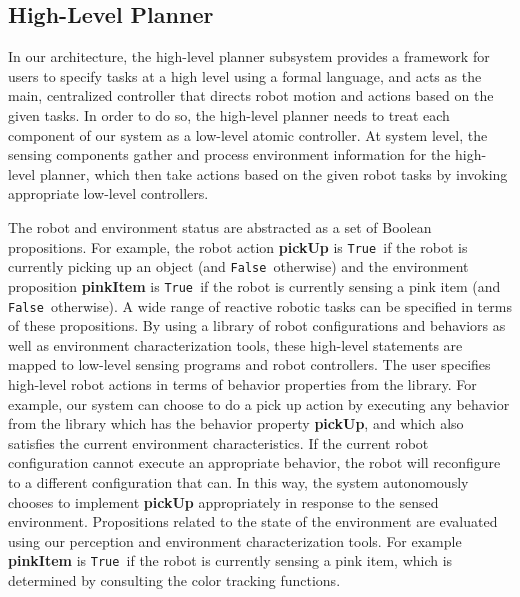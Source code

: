 \documentclass[conference]{IEEEtran}
\newcommand{\lt}{{\tt True }}
\newcommand{\lf}{{\tt False }}
\begin{document}
\subsection{High-Level Planner}
\label{sec:high-level}

In our architecture, the high-level planner subsystem provides a framework for users to specify tasks  at a high level using a formal language, and acts as the main, centralized controller that directs robot motion and actions based on the given tasks.
In order to do so, the high-level planner needs to treat each component of our system as a low-level atomic controller.
At system level, the sensing components gather and process environment information for the high-level planner, which then take actions based on the given robot tasks by invoking appropriate low-level controllers.

The robot and environment status are abstracted as a set of Boolean propositions.
For example, the robot action \textbf{pickUp} is \lt if the robot is currently picking up an object (and \lf otherwise) and the environment proposition \textbf{pinkItem} is \lt if the robot is currently sensing a pink item (and \lf otherwise).
A wide range of reactive robotic tasks can be specified in terms of these propositions.
By using a library of robot configurations and behaviors as well as environment characterization tools, these high-level statements are mapped to low-level sensing programs and robot controllers.
The user specifies high-level robot actions in terms of behavior properties from the library. For example, our system can choose to do a pick up action by executing any behavior from the library which has the behavior property \textbf{pickUp}, and which also satisfies the current environment characteristics. If the current robot configuration cannot execute an appropriate behavior, the robot will reconfigure to a different configuration that can.  In this way, the system autonomously chooses to implement  \textbf{pickUp}  appropriately in response to the sensed environment.
Propositions related to the state of the environment are evaluated using our perception and environment characterization tools. For example \textbf{pinkItem} is \lt if the robot is currently sensing a pink item, which is determined by consulting the color tracking functions.
\end{document}
